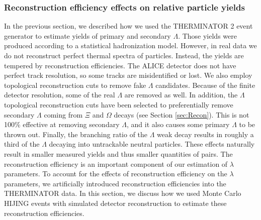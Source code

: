 \subsubsection{Reconstruction efficiency effects on relative particle yields}
\label{sec:ReconstructionEff}

  

In the previous section, we described how we used the THERMINATOR 2 event generator to estimate yields of primary and secondary $\Lambda$.
Those yields were produced according to a statistical hadronization model.
However, in real data we do not reconstruct perfect thermal spectra of particles. 
Instead, the yields are tempered by reconstruction efficiencies.
The ALICE detector does not have perfect track resolution, so some tracks are misidentified or lost.
We also employ topological reconstruction cuts to remove fake $\Lambda$ candidates.
Because of the finite detector resolution, some of the real $\Lambda$ are removed as well.
In addition, the $\Lambda$ topological reconstruction cuts have been selected to preferentially remove secondary $\Lambda$ coming from $\Xi$ and $\Omega$ decays (see Section \ref{sec:Recon}).
This is not 100\% effective at removing secondary $\Lambda$, and it also causes some primary $\Lambda$ to be thrown out.
Finally, the branching ratio of the $\Lambda$ weak decay results in roughly a third of the $\Lambda$ decaying into untrackable neutral particles.
These effects naturally result in smaller measured yields and thus smaller quantities of pairs.
The reconstruction efficiency is an important component of our estimation of $\lambda$ parameters.
To account for the effects of reconstruction efficiency on the $\lambda$ parameters, we artificially introduced reconstruction efficiencies into the THERMINATOR data. 
In this section, we discuss how we used Monte Carlo HIJING events with simulated detector reconstruction to estimate these reconstruction efficiencies.


